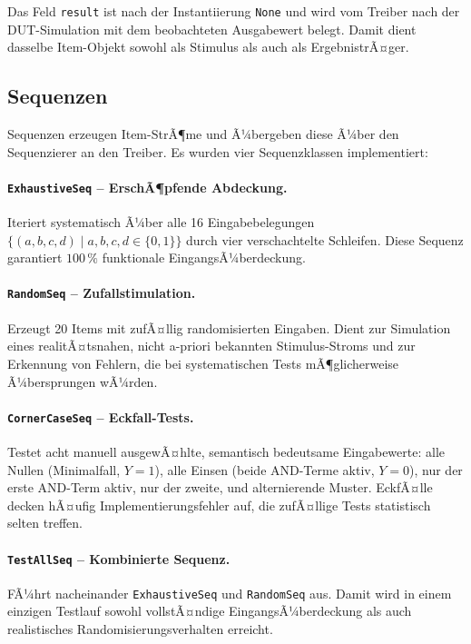 ﻿\documentclass[12pt,a4paper]{report}
\begin{document}
Das Feld \texttt{result} ist nach der Instantiierung \texttt{None} und wird
vom Treiber nach der DUT-Simulation mit dem beobachteten Ausgabewert belegt.
Damit dient dasselbe Item-Objekt sowohl als Stimulus als auch als ErgebnistrÃ¤ger.

\subsection{Sequenzen}
\label{sssec:sequenzen}

Sequenzen erzeugen Item-StrÃ¶me und Ã¼bergeben diese Ã¼ber den Sequenzierer an den
Treiber. Es wurden vier Sequenzklassen implementiert:

\paragraph{\texttt{ExhaustiveSeq} -- ErschÃ¶pfende Abdeckung.}
Iteriert systematisch Ã¼ber alle 16 Eingabebelegungen $\{(a,b,c,d) \mid a,b,c,d \in \{0,1\}\}$
durch vier verschachtelte Schleifen. Diese Sequenz garantiert $100\,\%$
funktionale EingangsÃ¼berdeckung.

\paragraph{\texttt{RandomSeq} -- Zufall\-stimulation.}
Erzeugt 20 Items mit zufÃ¤llig randomisierten Eingaben. Dient zur Simulation
eines realitÃ¤tsnahen, nicht a-priori bekannten Stimulus-Stroms und zur
Erkennung von Fehlern, die bei systematischen Tests mÃ¶glicherweise Ã¼bersprungen
wÃ¼rden.

\paragraph{\texttt{CornerCaseSeq} -- Eckfall-Tests.}
Testet acht manuell ausgewÃ¤hlte, semantisch bedeutsame Eingabewerte:
alle Nullen (Minimalfall, $Y=1$), alle Einsen (beide AND-Terme aktiv, $Y=0$),
nur der erste AND-Term aktiv, nur der zweite, und alternierende Muster.
EckfÃ¤lle decken hÃ¤ufig Implementierungsfehler auf, die zufÃ¤llige Tests
statistisch selten treffen.

\paragraph{\texttt{TestAllSeq} -- Kombinierte Sequenz.}
FÃ¼hrt nacheinander \texttt{ExhaustiveSeq} und \texttt{Random\newline Seq} aus.
Damit wird in einem einzigen Testlauf sowohl vollstÃ¤ndige EingangsÃ¼berdeckung
als auch realistisches Randomisierungsverhalten erreicht.
\end{document}
